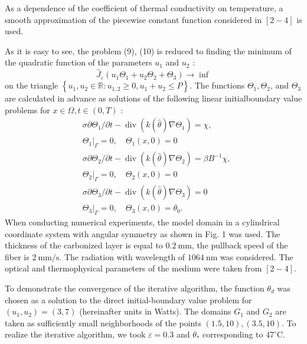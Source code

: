 \documentclass[10pt]{article}
\begin{document}
As a dependence of the coefficient of thermal conductivity on temperature, a smooth approximation of the piecewise constant function considered in $[2-4]$ is used.

As it is easy to see, the problem (9), (10) is reduced to finding the minimum of the quadratic function of the parameters $u_{1}$ and $u_{2}$ :
$$
\widehat{J}_{\varepsilon}\left(u_{1} \Theta_{1}+u_{2} \Theta_{2}+\Theta_{3}\right) \rightarrow \inf
$$
on the triangle $\left\{u_{1}, u_{2} \in \mathbb{R}: u_{1,2} \geq 0, u_{1}+u_{2} \leq P\right\}$. The functions $\Theta_{1}, \Theta_{2}$, and $\Theta_{3}$ are calculated in advance as solutions of the following linear initialboundary value problems for $x \in \Omega, t \in(0, T)$ :
$$
\begin{aligned}
&\sigma \partial \Theta_{1} / \partial t-\operatorname{div}\left(k(\widehat{\theta}) \nabla \Theta_{1}\right)=\chi, \\
&\left.\Theta_{1}\right|_{\Gamma}=0, \quad \Theta_{1}(x, 0)=0 \\
&\sigma \partial \Theta_{2} / \partial t-\operatorname{div}\left(k(\widehat{\theta}) \nabla \Theta_{2}\right)=\beta B^{-1} \chi, \\
&\left.\Theta_{2}\right|_{\Gamma}=0, \quad \Theta_{2}(x, 0)=0 \\
&\sigma \partial \Theta_{3} / \partial t-\operatorname{div}\left(k(\widehat{\theta}) \nabla \Theta_{3}\right)=0 \\
&\left.\Theta_{3}\right|_{\Gamma}=0, \quad \Theta_{3}(x, 0)=\theta_{0} .
\end{aligned}
$$
When conducting numerical experiments, the model domain in a cylindrical coordinate system with angular symmetry as shown in Fig. 1 was used. The thickness of the carbonized layer is equal to $0.2 \mathrm{~mm}$, the pullback speed of the fiber is $2 \mathrm{~mm} / \mathrm{s}$. The radiation with wavelength of $1064 \mathrm{~nm}$ was considered. The optical and thermophysical parameters of the medium were taken from $[2-4]$.

To demonstrate the convergence of the iterative algorithm, the function $\theta_{d}$ was chosen as a solution to the direct initial-boundary value problem for $\left(u_{1}, u_{2}\right)=(3,7)$ (hereinafter units in Watts). The domains $G_{1}$ and $G_{2}$ are taken as sufficiently small neighborhoods of the points $(1.5,10),(3.5,10)$. To realize the iterative algorithm, we took $\varepsilon=0.3$ and $\theta_{*}$ corresponding to $47^{\circ} \mathrm{C}$.
\end{document}
